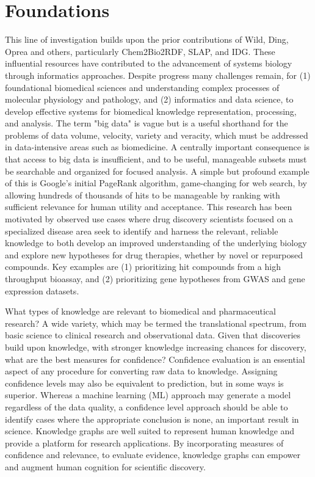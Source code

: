 \section{Foundations}

This line of investigation builds upon the prior contributions of Wild, Ding, Oprea and others, particularly Chem2Bio2RDF\cite{Chen2010-to}, SLAP\cite{Chen2012-iq}, and IDG\cite{Oprea2018-cp}. These influential resources have contributed to the advancement of systems biology through informatics approaches. Despite progress many challenges remain, for (1) foundational biomedical sciences and understanding complex processes of molecular physiology and pathology, and (2) informatics and data science, to develop effective systems for biomedical knowledge representation, processing, and analysis.  The term "big data" is vague but is a useful shorthand for the problems of data volume, velocity, variety and veracity, which must be addressed in data-intensive areas such as biomedicine.  A centrally important consequence is that access to big data is insufficient, and to be useful, manageable subsets must be searchable and organized for focused analysis.  A simple but profound example of this is Google's initial PageRank algorithm, game-changing for web search, by allowing hundreds of thousands of hits to be manageable by ranking with sufficient relevance for human utility and acceptance.  This research has been motivated by observed use cases where drug discovery scientists focused on a specialized disease area seek to identify and harness the relevant, reliable knowledge to both develop an improved understanding of the underlying biology and explore new hypotheses for drug therapies, whether by novel or repurposed compounds. Key examples are (1) prioritizing hit compounds from a high throughput bioassay, and (2) prioritizing gene hypotheses from GWAS and gene expression datasets.

What types of knowledge are relevant to biomedical and pharmaceutical research?  A wide variety, which may be termed the translational spectrum, from basic science to clinical research and observational data. Given that discoveries build upon knowledge, with stronger knowledge increasing chances for discovery, what are the best measures for confidence?  Confidence evaluation is an essential aspect of any procedure for converting raw data to knowledge.  Assigning confidence levels may also be equivalent to prediction, but in some ways is superior.  Whereas a machine learning (ML) approach may generate a model regardless of the data quality, a confidence level approach should be able to identify cases where the appropriate conclusion is none, an important result in science. Knowledge graphs are well suited to represent human knowledge and provide a platform for research applications. By incorporating measures of confidence and relevance, to evaluate evidence, knowledge graphs can empower and augment human cognition for scientific discovery.

